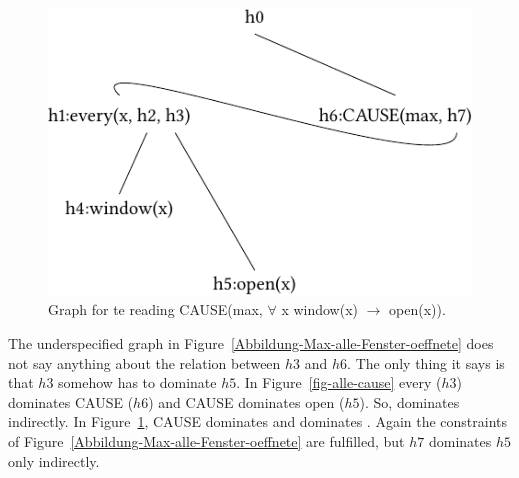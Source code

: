\begin{figure}
\centering

\includegraphics{Figures/solution-mrs-cause-all-open-cropped.pdf}
\caption{Graph for te reading CAUSE(max, $\forall$ x window(x) $\to$ open(x)).\label{fig-cause-alle}}
\end{figure}%
The underspecified graph in Figure~\ref{Abbildung-Max-alle-Fenster-oeffnete} does not say anything
about the relation between $h3$ and $h6$. The only thing it says is that $h3$ somehow has to dominate
$h5$. In Figure~\ref{fig-alle-cause} every ($h3$) dominates CAUSE ($h6$) and CAUSE dominates open
($h5$). So,  dominates  indirectly. In Figure~\ref{fig-cause-alle}, CAUSE
dominates  and  dominates . Again the constraints of
Figure~\ref{Abbildung-Max-alle-Fenster-oeffnete} are fulfilled, but $h7$ dominates $h5$ only indirectly.

